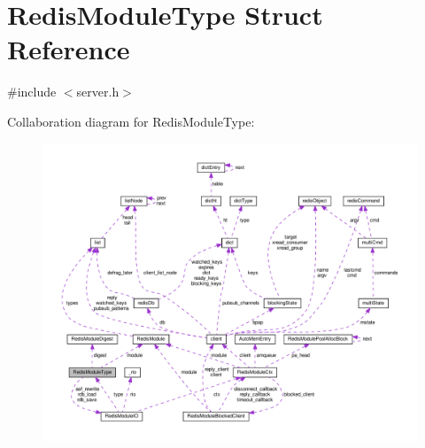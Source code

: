 \hypertarget{struct_redis_module_type}{}\section{Redis\+Module\+Type Struct Reference}
\label{struct_redis_module_type}


{\ttfamily \#include $<$server.\+h$>$}



Collaboration diagram for Redis\+Module\+Type\+:
\nopagebreak
\begin{figure}[H]
\begin{center}
\leavevmode
\includegraphics[width=350pt]{struct_redis_module_type__coll__graph}
\end{center}
\end{figure}
